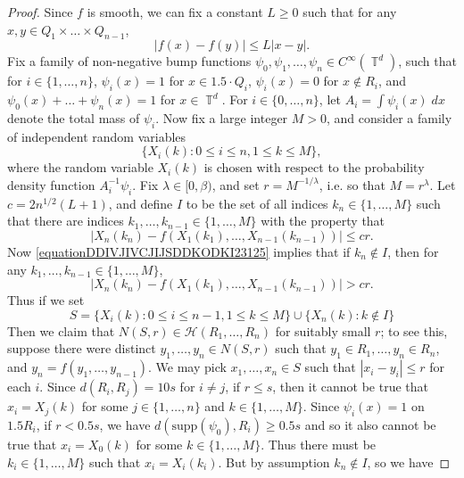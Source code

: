 \documentclass[dvipsnames,letterpaper,12pt]{article}
\numberwithin{equation}{section}
\DeclareMathOperator{\TT}{\mathbb{T}}
\numberwithin{theorem}{section}
\begin{document}
\begin{proof}
    Since $f$ is smooth, we can fix a constant $L \geq 0$ such that for any $x,y \in Q_1 \times \dots \times Q_{n-1}$,
    \begin{equation} \label{eqiatiojawoij2134141235235231}
        |f(x) - f(y)| \leq L|x - y|.
    \end{equation}
    Fix a family of non-negative bump functions $\psi_0,\psi_1,\dots,\psi_n \in C^\infty(\TT^d)$, such that for $i \in \{ 1,\dots,n \}$, $\psi_i(x) = 1$ for $x \in 1.5 \cdot Q_i$, $\psi_i(x) = 0$ for $x \not \in R_i$, and $\psi_0(x) + \dots + \psi_n(x) = 1$ for $x \in \TT^d$. For $i \in \{ 0, \dots, n \}$, let $A_i = \int \psi_i(x)\; dx$ denote the total mass of $\psi_i$. Now fix a large integer $M > 0$, and consider a family of independent random variables
    \[ \{ X_i(k) : 0 \leq i \leq n, 1 \leq k \leq M \}, \]
    where the random variable $X_i(k)$ is chosen with respect to the probability density function $A_i^{-1} \psi_i$. Fix $\lambda \in [0,\beta)$, and set $r = M^{-1/\lambda}$, i.e. so that $M = r^\lambda$. Let $c = 2 n^{1/2} (L+1)$, and define $I$ to be the set of all indices $k_n \in \{ 1, \dots, M \}$ such that there are indices $k_1,\dots,k_{n-1} \in \{ 1,\dots,M \}$ with the property that
    \begin{equation} \label{equationDDIVJIVCJIJSDDKODKI23125}
        |X_n(k_n) - f(X_1(k_1),\dots,X_{n-1}(k_{n-1}))| \leq cr.
    \end{equation}
    Now \eqref{equationDDIVJIVCJIJSDDKODKI23125} implies that if $k_n \not \in I$, then for any $k_1,\dots,k_{n-1} \in \{ 1, \dots, M \}$,
    \begin{equation}
        |X_n(k_n) - f(X_1(k_1),\dots,X_{n-1}(k_{n-1}))| > cr.
    \end{equation}
    Thus if we set
    \[ S = \{ X_i(k) : 0 \leq i \leq n-1, 1 \leq k \leq M \} \cup \{ X_n(k) : k \not \in I \} \]
    Then we claim that $N(S,r) \in \mathcal{H}(R_1,\dots,R_n)$ for suitably small $r$; to see this, suppose there were distinct $y_1,\dots,y_n \in N(S,r)$ such that $y_1 \in R_1, \dots, y_n \in R_n$, and $y_n = f(y_1,\dots,y_{n-1})$. We may pick $x_1,\dots,x_n \in S$ such that $|x_i - y_i| \leq r$ for each $i$. Since $d(R_i,R_j) = 10s$ for $i \neq j$, if $r \leq s$, then it cannot be true that $x_i = X_j(k)$ for some $j \in \{ 1, \dots, n \}$ and $k \in \{ 1, \dots, M \}$. Since $\psi_i(x) = 1$ on $1.5 R_i$, if $r < 0.5 s$, we have $d(\text{supp}(\psi_0), R_i) \geq 0.5 s$ and so it also cannot be true that $x_i = X_0(k)$ for some $k \in \{ 1, \dots, M \}$. Thus there must be $k_i \in \{ 1, \dots, M \}$ such that $x_i = X_i(k_i)$. But by assumption $k_n \not \in I$, so we have

\end{proof}
\end{document}
